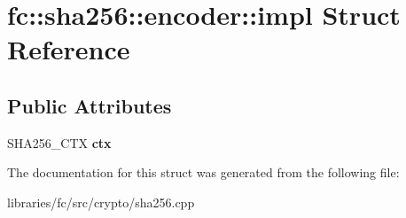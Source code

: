 \hypertarget{structfc_1_1sha256_1_1encoder_1_1impl}{}\section{fc\+:\+:sha256\+:\+:encoder\+:\+:impl Struct Reference}
\label{structfc_1_1sha256_1_1encoder_1_1impl}
\subsection*{Public Attributes}
\begin{DoxyCompactItemize}
\item 
\mbox{\label{structfc_1_1sha256_1_1encoder_1_1impl_aadce4384afc470d17eb3e764d08f6b78}} 
S\+H\+A256\+\_\+\+C\+TX {\bfseries ctx}
\end{DoxyCompactItemize}


The documentation for this struct was generated from the following file\+:\begin{DoxyCompactItemize}
\item 
libraries/fc/src/crypto/sha256.\+cpp\end{DoxyCompactItemize}
